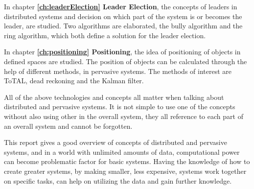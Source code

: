 In chapter \textbf{\ref{ch:leaderElection} Leader Election}, the concepts of leaders in distributed systems and decision on which part of the system is or becomes the leader, are studied. Two algorithms are elaborated, the bully algorithm and the ring algorithm, which both define a solution for the leader election.

In chapter \textbf{\ref{ch:positioning} Positioning}, the idea of positioning of objects in defined spaces are studied. The position of objects can be calculated through the help of different methods, in pervasive systems. The methods of interest are ToTAL, dead reckoning and the Kalman filter.

All of the above technologies and concepts all matter when talking about distributed and pervasive systems. It is not simple to use one of the concepts without also using other in the overall system, they all reference to each part of an overall system and cannot be forgotten.

This report gives a good overview of concepts of distributed and pervasive systems, and in a world with unlimited amounts of data, computational power can become problematic factor for basic systems. Having the knowledge of how to create greater systems, by making smaller, less expensive, systems work together on specific tasks, can help on utilizing the data and gain further knowledge.




